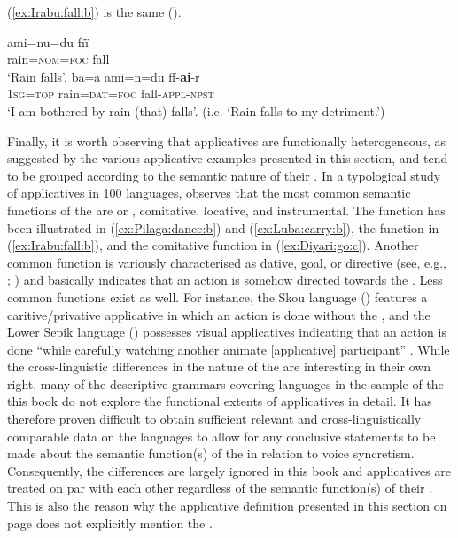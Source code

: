 (\ref{ex:Irabu:fall:b}) is the same ().

\ea {} \citep[495]{shimoji:2008}
\ea\label{ex:Irabu:fall:a}
	\gll	ami=nu=du 				fïï 	\\
			rain=\textsc{nom=foc} 	fall 	\\
	\glt	‘Rain falls’.
\ex\label{ex:Irabu:fall:b}
	\gll	ba=a 				ami=n=du 				ff-\textbf{ai}-r 		\\
			\textsc{1sg=top} 	rain=\textsc{dat=foc} 	fall-\textsc{appl-npst}	\\
	\glt	‘I am bothered by rain (that) falls’. (i.e. ‘Rain falls to my detriment.')
	\z 
\z

Finally, it is worth observing that applicatives are functionally heterogeneous, as suggested by the various applicative examples presented in this section, and tend to be grouped according to the semantic nature of their . In a typological study of applicatives in 100 languages, \citet[202f.]{peterson:2007} observes that the most common semantic functions of the  are  or , comitative, locative, and instrumental. The  function has been illustrated in  (\ref{ex:Pilaga:dance:b}) and  (\ref{ex:Luba:carry:b}), the  function in  (\ref{ex:Irabu:fall:b}), and the comitative function in  (\ref{ex:Diyari:go:c}). Another common function is variously characterised as dative, goal, or directive (see, e.g., \citealt[1135]{haspelmath:muller-bardey:2004}; \citealt[187]{peterson:2007}) and basically indicates that an action is somehow directed towards the . Less common functions exist as well. For instance, the Skou language  () features a caritive/privative applicative in which an action is done without the  \citep[258f.]{corris:2005}, and the Lower Sepik language  () possesses visual applicatives indicating that an action is done “while carefully watching another animate [applicative] participant” \citep[315]{foley:1991}. While the cross-linguistic differences in the nature of the  are interesting in their own right, many of the descriptive grammars covering languages in the sample of the this book do not explore the functional extents of applicatives in detail. It has therefore proven difficult to obtain sufficient relevant and cross-linguistically comparable data on the languages to allow for any conclusive statements to be made about the semantic function(s) of the  in relation to voice syncretism. Consequently, the differences are largely ignored in this book and applicatives are treated on par with each other regardless of the semantic function(s) of their . This is also the reason why the applicative definition presented in this section on page \pageref{def:applicatives} does not explicitly mention the .

